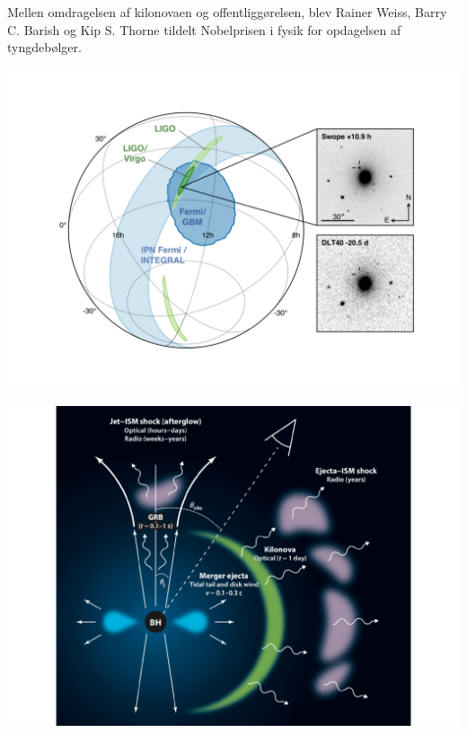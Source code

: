 \documentclass[twocolumn]{article}
\begin{document}
Mellen omdragelsen af kilonovaen og offentliggørelsen, blev Rainer Weiss, Barry C. Barish og Kip S. Thorne tildelt Nobelprisen i fysik for opdagelsen af tyngdebølger. 

\begin{center}
\includegraphics[width=\columnwidth]{GW170817_MMA_Skymap}
\end{center}


\begin{center}
\includegraphics[width=\columnwidth]{KN_scematic_berger.pdf}
\end{center}
\end{document}
